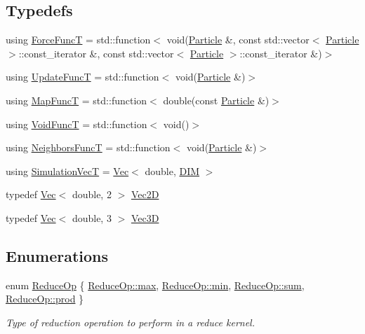 \subsection*{Typedefs}
\begin{DoxyCompactItemize}
\item 
using \mbox{\hyperlink{namespacewash_a3687ea698f8cb8c077d728e5d74de495}{Force\+FuncT}} = std\+::function$<$ void(\mbox{\hyperlink{classwash_1_1Particle}{Particle}} \&, const std\+::vector$<$ \mbox{\hyperlink{classwash_1_1Particle}{Particle}} $>$\+::const\+\_\+iterator \&, const std\+::vector$<$ \mbox{\hyperlink{classwash_1_1Particle}{Particle}} $>$\+::const\+\_\+iterator \&)$>$
\item 
using \mbox{\hyperlink{namespacewash_aaae2f0d4980b7c550d6de709b35f0b8e}{Update\+FuncT}} = std\+::function$<$ void(\mbox{\hyperlink{classwash_1_1Particle}{Particle}} \&)$>$
\item 
using \mbox{\hyperlink{namespacewash_ad515914307c88c01ff7524c57feabf83}{Map\+FuncT}} = std\+::function$<$ double(const \mbox{\hyperlink{classwash_1_1Particle}{Particle}} \&)$>$
\item 
using \mbox{\hyperlink{namespacewash_a7de7a4195ce994df4dd54ff86e3fff20}{Void\+FuncT}} = std\+::function$<$ void()$>$
\item 
using \mbox{\hyperlink{namespacewash_a8135d763bfc59fce07b49873d8af0ed6}{Neighbors\+FuncT}} = std\+::function$<$ void(\mbox{\hyperlink{classwash_1_1Particle}{Particle}} \&)$>$
\item 
using \mbox{\hyperlink{namespacewash_ab2cbbc37941b733095c9225b49b4cad9}{Simulation\+VecT}} = \mbox{\hyperlink{classwash_1_1Vec}{Vec}}$<$ double, \mbox{\hyperlink{wser_8hpp_ac25189db92959bff3c6c2adf4c34b50a}{D\+IM}} $>$
\item 
typedef \mbox{\hyperlink{classwash_1_1Vec}{Vec}}$<$ double, 2 $>$ \mbox{\hyperlink{namespacewash_a905f2d902fc7aaab0e8a58b6ee25baf1}{Vec2D}}
\item 
typedef \mbox{\hyperlink{classwash_1_1Vec}{Vec}}$<$ double, 3 $>$ \mbox{\hyperlink{namespacewash_a57da016a0635e7d25a96165adb48c7e3}{Vec3D}}
\end{DoxyCompactItemize}
\subsection*{Enumerations}
\begin{DoxyCompactItemize}
\item 
enum \mbox{\hyperlink{namespacewash_a9c59e8c142d63d8640921c1b1957807e}{Reduce\+Op}} \{ \mbox{\hyperlink{namespacewash_a9c59e8c142d63d8640921c1b1957807ea2ffe4e77325d9a7152f7086ea7aa5114}{Reduce\+Op\+::max}}, 
\mbox{\hyperlink{namespacewash_a9c59e8c142d63d8640921c1b1957807ead8bd79cc131920d5de426f914d17405a}{Reduce\+Op\+::min}}, 
\mbox{\hyperlink{namespacewash_a9c59e8c142d63d8640921c1b1957807ea1d623b89683f9ce4e074de1676d12416}{Reduce\+Op\+::sum}}, 
\mbox{\hyperlink{namespacewash_a9c59e8c142d63d8640921c1b1957807ead6e4a9b6646c62fc48baa6dd6150d1f7}{Reduce\+Op\+::prod}}
 \}
\begin{DoxyCompactList}\small\item\em Type of reduction operation to perform in a reduce kernel. \end{DoxyCompactList}\end{DoxyCompactItemize}
